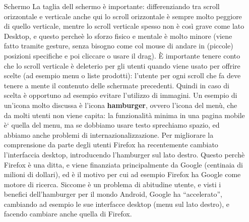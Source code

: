 \begin{enumerate}
\item[Schermo] La taglia dell schermo \`e importante: differenziando tra scroll orizzontale e verticale anche qui lo scroll orizzontale \`e sempre molto peggiore di quello verticale, mentre lo scroll verticale spesso non \`e cos\`i grave come lato Desktop, e questo perche\`e lo sforzo fisico e mentale \`e molto minore (viene fatto tramite gesture, senza bisogno come col mouse di andare in (piccole) posizioni specifiche e poi cliccare o usare il drag). \`E importante tenere conto che lo scroll verticale \`e deleterio per gli utenti quando viene usato per offrire scelte (ad esempio menu o liste prodotti): l'utente per ogni scroll che fa deve tenere a mente il contenuto delle schermate precedenti. Quindi in caso di scelta \`e opportuno ad esempio evitare l'utilizzo di immagini. Un esempio di un'icona molto discussa \`e l'icona \textbf{hamburger}, ovvero l'icona del men\`u, che da molti utenti non viene capita: la funzionalit\`a minima in una pagina mobile \`e` quella del menu, ma se dobbiamo usare testo sprechiamo spazio, ed abbiamo anche problemi di internazionalizzazione. Per migliorare la comprensione da parte degli utenti Firefox ha recentemente cambiato l'interfaccia desktop, introducendo l'hamburger sul lato destro. Questo perch\`e Firefox \`e una ditta, e viene finanziata principalmente da Google (centinaia di milioni di dollari), ed \`e il motivo per cui ad esempio Firefox ha Google come motore di ricerca. Siccome \`e un problema di abitudine utente, e visti i benefici dell'hamburger per il mondo Android, Google ha ``accelerato'', cambiando ad esempio le sue interfacce desktop (menu sul lato destro), e facendo cambiare anche quella di Firefox.
  
\end{enumerate}
